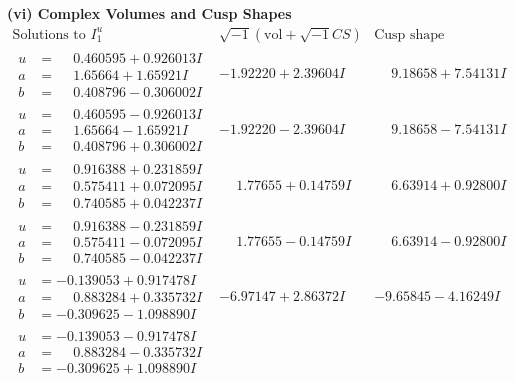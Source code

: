 \documentclass[1p]{elsarticle_modified}
\theoremstyle{definition}
\newcommand{\I}{\sqrt{-1}}
\begin{document}
\newpage\flushleft \textbf{(vi) Complex Volumes and Cusp Shapes}
$$\begin{array}{c|c|c}  
\text{Solutions to }I^u_{1}& \I (\text{vol} + \sqrt{-1}CS) & \text{Cusp shape}\\
 \hline 
\begin{aligned}
u &= \phantom{-}0.460595 + 0.926013 I \\
a &= \phantom{-}1.65664 + 1.65921 I \\
b &= \phantom{-}0.408796 - 0.306002 I\end{aligned}
 & -1.92220 + 2.39604 I & \phantom{-}9.18658 + 7.54131 I \\ \hline\begin{aligned}
u &= \phantom{-}0.460595 - 0.926013 I \\
a &= \phantom{-}1.65664 - 1.65921 I \\
b &= \phantom{-}0.408796 + 0.306002 I\end{aligned}
 & -1.92220 - 2.39604 I & \phantom{-}9.18658 - 7.54131 I \\ \hline\begin{aligned}
u &= \phantom{-}0.916388 + 0.231859 I \\
a &= \phantom{-}0.575411 + 0.072095 I \\
b &= \phantom{-}0.740585 + 0.042237 I\end{aligned}
 & \phantom{-}1.77655 + 0.14759 I & \phantom{-}6.63914 + 0.92800 I \\ \hline\begin{aligned}
u &= \phantom{-}0.916388 - 0.231859 I \\
a &= \phantom{-}0.575411 - 0.072095 I \\
b &= \phantom{-}0.740585 - 0.042237 I\end{aligned}
 & \phantom{-}1.77655 - 0.14759 I & \phantom{-}6.63914 - 0.92800 I \\ \hline\begin{aligned}
u &= -0.139053 + 0.917478 I \\
a &= \phantom{-}0.883284 + 0.335732 I \\
b &= -0.309625 - 1.098890 I\end{aligned}
 & -6.97147 + 2.86372 I & -9.65845 - 4.16249 I \\ \hline\begin{aligned}
u &= -0.139053 - 0.917478 I \\
a &= \phantom{-}0.883284 - 0.335732 I \\
b &= -0.309625 + 1.098890 I\end{aligned}

\end{array}$$
\end{document}
